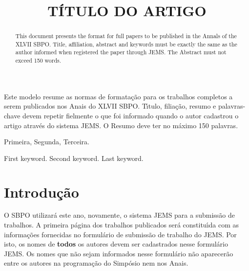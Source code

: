 \documentclass[a4paper,11pt]{article}
\title{T\'ITULO DO ARTIGO}
\begin{document}
\maketitle

\author{
}

\author{ 
}

\vspace{8mm}
\begin{resumo}
Este modelo resume as normas de formata\c c\~ao para os trabalhos completos a serem publicados
nos Anais do XLVII SBPO. T\'\i tulo, filia\c c\~ao, resumo e palavras-chave devem repetir fielmente
o que foi informado quando o autor cadastrou o artigo atrav\' es do sistema JEMS.
O Resumo deve ter no m\' aximo 150 palavras.
 \end{resumo}

\bigskip
\begin{palchaves}
Primeira, Segunda, Terceira.

\bigskip
{}
\end{palchaves}


\vspace{8mm}

\begin{abstract}
This document presents the format for full papers to be published in the Annals of the XLVII SBPO.
Title, affiliation, abstract and keywords must be exactly the same as the author informed when registered the paper through JEMS. 
The Abstract must not exceed 150 words.
\end{abstract}

\bigskip
\begin{keywords}
First keyword. Second keyword. Last keyword.

\bigskip
{}
\end{keywords}

 
\newpage
  \section{Introdu\c{c}\~ao}
 
O SBPO utilizar\'a este ano, novamente, o sistema JEMS para a submiss\~ao de trabalhos.
A primeira p\'agina dos trabalhos publicados ser\'a constitu\'\i da com as informa\c c\~oes fornecidas
no formul\'ario de submiss\~ao de trabalho do JEMS.
Por isto, os nomes de \textbf {todos} os autores devem ser cadastrados nesse formul\'ario JEMS.
Os nomes que n\~ao sejam informados nesse formul\'ario n\~ao aparecer\~ao entre os autores
na programa\c c\~ao do Simp\'osio nem nos Anais.
\end{document}
